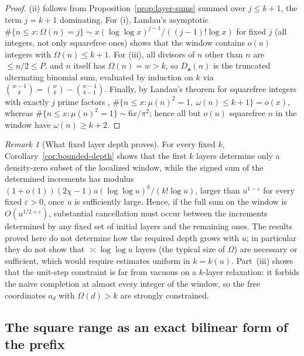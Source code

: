 \documentclass[11pt,reqno]{amsart}
\numberwithin{equation}{section}
\theoremstyle{plain}
\theoremstyle{definition}
\theoremstyle{remark}
\newtheorem{remark}[theorem]{Remark}
\newcommand{\eps}{\varepsilon}
\begin{document}
\begin{proof}
(ii) follows from Proposition~\ref{prop:layer-sums} summed over
$j\le k+1$, the term $j=k+1$ dominating. For (i), Landau's asymptotic
$\#\{n\le x:\Omega(n)=j\}\sim x(\log\log x)^{j-1}/((j-1)!\log x)$ for
fixed $j$ \cite[Ch.~7]{MontgomeryVaughan2007} (all integers, not only
squarefree ones) shows that the window contains $o(u)$ integers with
$\Omega(n)\le k+1$. For (iii), all divisors of $n$
other than $n$ are $\le n/2\le P$, and $n$ itself has $\Omega(n)=w>k$, so
$D_{\mathbf a}(n)$ is the truncated alternating binomial sum, evaluated by
induction on $k$ via $\binom{w-1}{k}=\binom wk-\binom{w-1}{k-1}$. Finally, by
Landau's theorem for squarefree integers with exactly $j$ prime factors
\cite[Ch.~7]{MontgomeryVaughan2007},
$\#\{n\le x:\mu(n)^2=1,\ \omega(n)\le k+1\}=o(x)$, whereas
$\#\{n\le x:\mu(n)^2=1\}\sim6x/\pi^2$; hence all but $o(u)$ squarefree $n$ in
the window have $\omega(n)\ge k+2$.
\end{proof}

\begin{remark}[What fixed layer depth proves]
\label{rem:depth-content}
For every fixed $k$, Corollary~\ref{cor:bounded-depth} shows that the first
$k$ layers determine only a density-zero subset of the localized window,
while the signed sum of the determined increments has modulus
$(1+o(1))(2\chi-1)u(\log\log u)^k/(k!\log u)$, larger than $u^{1-\eps}$ for every fixed $\eps>0$, once $u$ is sufficiently large. Hence, if the full sum on the window is
$O(u^{1/2+\eps})$, substantial cancellation must occur between the
increments determined by any fixed set of initial layers and the remaining
ones. The results proved here do not determine how the required depth grows
with $u$; in particular they do not show that $\asymp\log\log u$ layers
(the typical size of $\Omega$) are necessary or sufficient, which would
require estimates uniform in $k=k(u)$. Part~(iii) shows that the unit-step
constraint is far from vacuous on a $k$-layer relaxation: it forbids the
naive completion at almost every integer of the window, so the free
coordinates $a_d$ with $\Omega(d)>k$ are strongly constrained.
\end{remark}



\subsection{The square range as an exact bilinear form of the prefix}
\end{document}
